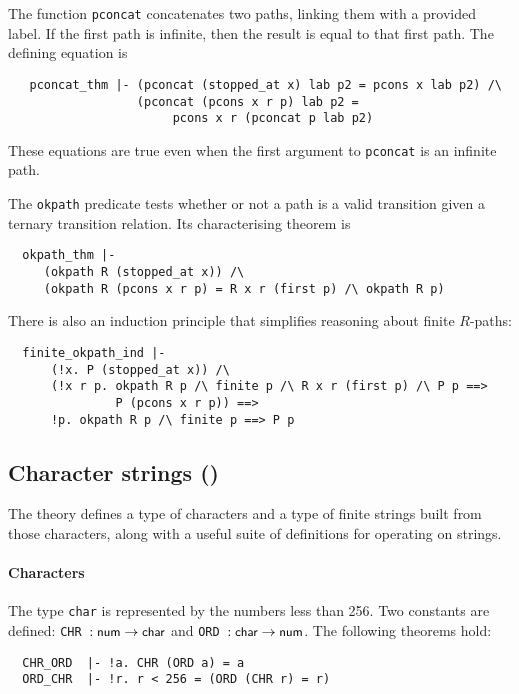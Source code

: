 The function \texttt{pconcat} concatenates two paths, linking them
with a provided label.  If the first path is infinite, then the result
is equal to that first path.  The defining equation is
{\small
\begin{verbatim}
   pconcat_thm |- (pconcat (stopped_at x) lab p2 = pcons x lab p2) /\
                  (pconcat (pcons x r p) lab p2 =
                       pcons x r (pconcat p lab p2)
\end{verbatim}
}
\noindent
These equations are true even when the first argument to
\texttt{pconcat} is an infinite path.

The \texttt{okpath} predicate tests whether or not a path is a valid
transition given a ternary transition relation.  Its characterising
theorem is
{\small
\begin{verbatim}
  okpath_thm |-
     (okpath R (stopped_at x)) /\
     (okpath R (pcons x r p) = R x r (first p) /\ okpath R p)
\end{verbatim}
}

There is also an induction principle that simplifies reasoning about
finite $R$-paths:
{\small
\begin{verbatim}
  finite_okpath_ind |-
      (!x. P (stopped_at x)) /\
      (!x r p. okpath R p /\ finite p /\ R x r (first p) /\ P p ==>
               P (pcons x r p)) ==>
      !p. okpath R p /\ finite p ==> P p
\end{verbatim}
}


\subsection{Character strings ()}

The theory  defines a type of characters and a type
of finite strings built from those characters, along with a useful suite of
definitions for operating on strings.

\paragraph {Characters}

The type \verb+char+ is represented by the numbers less than 256. Two
constants are defined: {\small\verb+CHR +}$: \mbox{\small{\textbf{\sf{num}}}}\to\mbox{\small{\textbf{\sf{char}}}}$ and
{\small\verb+ORD +}$: \mbox{\small{\textbf{\sf{char}}}}\to\mbox{\small{\textbf{\sf{num}}}}$. The following theorems
hold:
{\small
\begin{verbatim}
  CHR_ORD  |- !a. CHR (ORD a) = a
  ORD_CHR  |- !r. r < 256 = (ORD (CHR r) = r)
\end{verbatim}
}

